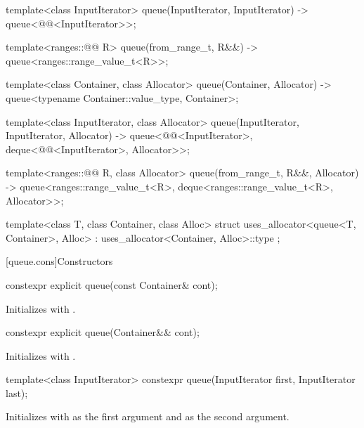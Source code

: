 \begin{codeblock}
{  template<class InputIterator>
    queue(InputIterator, InputIterator) -> queue<@@<InputIterator>>;

  template<ranges::@@ R>
    queue(from_range_t, R&&) -> queue<ranges::range_value_t<R>>;

  template<class Container, class Allocator>
    queue(Container, Allocator) -> queue<typename Container::value_type, Container>;

  template<class InputIterator, class Allocator>
    queue(InputIterator, InputIterator, Allocator)
      -> queue<@@<InputIterator>, deque<@@<InputIterator>,
               Allocator>>;

  template<ranges::@@ R, class Allocator>
    queue(from_range_t, R&&, Allocator)
      -> queue<ranges::range_value_t<R>, deque<ranges::range_value_t<R>, Allocator>>;

  template<class T, class Container, class Alloc>
    struct uses_allocator<queue<T, Container>, Alloc>
      : uses_allocator<Container, Alloc>::type { };
}
\end{codeblock}

[queue.cons]{Constructors}

%
\begin{itemdecl}
constexpr explicit queue(const Container& cont);
\end{itemdecl}

\begin{itemdescr}
\pnum
\effects
Initializes  with .
\end{itemdescr}

%
\begin{itemdecl}
constexpr explicit queue(Container&& cont);
\end{itemdecl}

\begin{itemdescr}
\pnum
\effects
Initializes  with .
\end{itemdescr}

%
\begin{itemdecl}
template<class InputIterator>
  constexpr queue(InputIterator first, InputIterator last);
\end{itemdecl}

\begin{itemdescr}
\pnum
\effects
Initializes  with
 as the first argument and  as the second argument.
\end{itemdescr}

